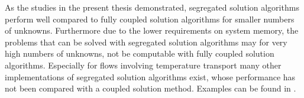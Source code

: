As the studies in the present thesis demonstrated, segregated solution algorithms perform well compared to fully coupled solution algorithms for smaller numbers of unknowns. Furthermore due to the lower requirements on system memory, the problems that can be solved with segregated solution algorithms may for very high numbers of unknowns, not be computable with fully coupled solution algorithms. Especially for flows involving temperature transport many other implementations of segregated solution algorithms exist, whose performance has not been compared with a coupled solution method. Examples can be found in \cite{liu84,oliveira01}.

